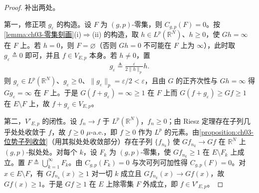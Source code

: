 \documentclass[../../main.tex]{subfiles}%
\begin{document}
\begin{proof}
补出两处。

第一，修正项 $g_\varepsilon$ 的构造。设 $F$ 为 $(g,p)$-零集，则 $C_{g,p}(F)=0$。按\cref{lemma:ch03-零集刻画}(i)$\Rightarrow$(ii) 的构造，取 $h\in L^p(\mathbb{R}^N)$、$h\geqslant0$，使 $Gh=\infty$ 在 $F$ 上。若 $h=0$，则 $F=\varnothing$（否则 $Gh=0$ 不可能在 $F$ 上为 $\infty$），此时取 $g_\varepsilon\triangleq0$ 即可，并且 $f\in V_{E,p}$ 本身。若 $h\neq0$，置
\begin{align*}
g_\varepsilon\triangleq\frac{\varepsilon}{2\|h\|_p}h .
\end{align*}
则 $g_\varepsilon\in L^p(\mathbb{R}^N)$、$g_\varepsilon\geqslant0$、$\|g_\varepsilon\|_p=\varepsilon/2<\varepsilon$，且由 $G$ 的正齐次性与 $Gh=\infty$ 得 $Gg_\varepsilon=\infty$ 在 $F$ 上。于是 $G(f+g_\varepsilon)=\infty\geqslant1$ 在 $F$ 上而 $G(f+g_\varepsilon)\geqslant Gf\geqslant1$ 在 $E\setminus F$ 上，故 $f+g_\varepsilon\in V_{E,p}$。

第二，$V'_{E,p}$ 的闭性。设 $f_n\to f$ 于 $L^p(\mathbb{R}^N)$，$f_n\geqslant0$；由 Riesz 定理存在子列几乎处处收敛于 $f$，故 $f\geqslant0$ $\mu$-a.e.，即 $f\geqslant0$ 作为 $L^p$ 的元素。由\cref{proposition:ch03-位势子列收敛}（用其拟处处收敛部分）存在子列 $\{f_{n_k}\}$ 使 $Gf_{n_k}\to Gf$ 在 $\mathbb{R}^N$ 上 $(g,p)$-拟处处。对每个 $k$，设 $F_k$ 为 $(g,p)$-零集，使 $Gf_{n_k}\geqslant1$ 在 $E\setminus F_k$ 上成立。置 $F\triangleq\bigcup_{k=1}^\infty F_k$。由 $C_{g,p}(F_k)=0$ 与次可列可加性得 $C_{g,p}(F)=0$。对 $x\in E\setminus F$，有 $Gf_{n_k}(x)\geqslant1$ 对一切 $k$ 成立且 $Gf_{n_k}(x)\to Gf(x)$，故 $Gf(x)\geqslant1$。于是 $Gf\geqslant1$ 在 $E$ 上除零集 $F$ 外成立，即 $f\in V'_{E,p}$。
\end{proof}
\end{document}
